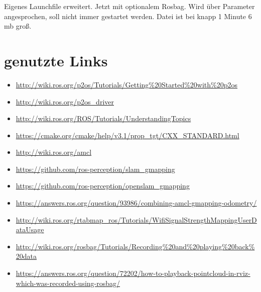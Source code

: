 \documentclass{scrartcl}%
\begin{document}
Eigenes Launchfile erweitert. Jetzt mit optionalem Rosbag. Wird über Parameter angesprochen, soll nicht immer gestartet werden. Datei ist bei knapp 1 Minute 6 mb groß.

\section{genutzte Links}
\begin{itemize}
	\item \url{http://wiki.ros.org/p2os/Tutorials/Getting%20Started%20with%20p2os}
		\item \url{http://wiki.ros.org/p2os_driver}
		\item \url{http://wiki.ros.org/ROS/Tutorials/UnderstandingTopics}
		\item \url{https://cmake.org/cmake/help/v3.1/prop_tgt/CXX_STANDARD.html}
		\item \url{http://wiki.ros.org/amcl}
		\item \url{https://github.com/ros-perception/slam\_gmapping}
		\item \url{https://github.com/ros-perception/openslam\_gmapping}
		\item \url{https://answers.ros.org/question/93986/combining-amcl-gmapping-odometry/}
		\item \url{http://wiki.ros.org/rtabmap_ros/Tutorials/WifiSignalStrengthMappingUserDataUsage}
		\item \url{http://wiki.ros.org/rosbag/Tutorials/Recording%20and%20playing%20back%20data}
		\item \url{https://answers.ros.org/question/72202/how-to-playback-pointcloud-in-rviz-which-was-recorded-using-rosbag/}
	\end{itemize}
\end{document}
